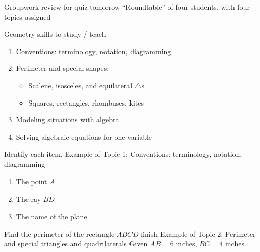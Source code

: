 \begin{frame}{Groupwork review for \alert{quiz tomorrow}}
  {``Roundtable'' of four students, with four topics assigned}
  \begin{block}{Geometry skills to study / teach}
      \begin{enumerate}
    \item Conventions: terminology, notation, diagramming
    \item Perimeter and special shapes: 
    \begin{itemize}
      \item Scalene, isosceles, and equilateral $\triangle$s
      \item Squares, rectangles, rhombuses, kites
    \end{itemize}
    \item Modeling situations with algebra
    \item Solving algebraic equations for one variable
  \end{enumerate}
  \end{block}
\end{frame}

\begin{frame}{Identify each item.}
  {Example of Topic 1: Conventions: terminology, notation, diagramming}
  \begin{enumerate} 
    \item The point $A$
    \item The ray $\overrightarrow{BD}$
    \item The name of the plane
    \end{enumerate} \vspace{1cm}
    \begin{center}
  \end{center}
\end{frame}

\begin{frame}{Find the perimeter of the rectangle $ABCD$ \alert{finish}}
  {Example of Topic 2: Perimeter and special triangles and quadrilaterals}
  Given $AB=6$ inches, $BC=4$ inches.
    \begin{center}
  \end{center}
\end{frame}

